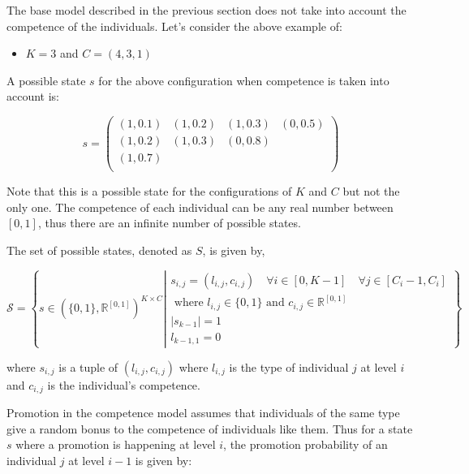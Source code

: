 \documentclass{article}
\newcommand{\R}{\mathbb{R}}
\renewcommand{\S}{\mathcal{S}}
\begin{document}
The base model described in the previous section does not take into account the
competence of the individuals. Let's consider the above example of:

\begin{itemize}
    \item \(K = 3\) and \(C = (4, 3, 1)\)
\end{itemize}

A possible state \(s\) for the above configuration when competence is taken into
account is:

\[
    s = \begin{pmatrix}
        (1, 0.1) & (1, 0.2) & (1, 0.3) & (0, 0.5) \\
        (1, 0.2) & (1, 0.3) & (0, 0.8) \\
        (1, 0.7) \\
    \end{pmatrix}
\]

Note that this is a possible state for the configurations of \(K\) and \(C\) but
not the only one. The competence of each individual can be any real number between
\([0, 1]\), thus there are an infinite number of possible states.

The set of possible states, denoted as \(S\), is given by,

\begin{equation}\label{eqn:state_space}
    \S = \left\{
        s \in (\{0, 1\}, \R^{[0,1]}) ^ {K \times C}  \left|
        \begin{array}{l}
         s_{i,j} = (l_{i, j}, c_{i, j}) \quad \forall i \in [0, K -1] \quad \forall j \in [C_i - 1, C_i] \\
        \text{ where } l_{i, j} \in \{0, 1\} \text{ and } c_{i, j} \in \R^{[0,1]} \\
        |s_{k - 1}| = 1  \\
        l_{k -1, 1} = 0
    \end{array}
    \right.\right\}
\end{equation}

where \(s_{i, j}\) is a tuple of \((l_{i, j}, c_{i, j})\) where \(l_{i, j}\) is the
type of individual \(j\) at level \(i\) and \(c_{i, j}\) is the individual's
competence.

Promotion in the competence model assumes that individuals of the same type give a random
bonus to the competence of individuals like them.
Thus for a state \(s\) where a promotion is happening at level \(i\), the promotion
probability of an individual \(j\) at level \(i - 1\) is given by:
\end{document}
